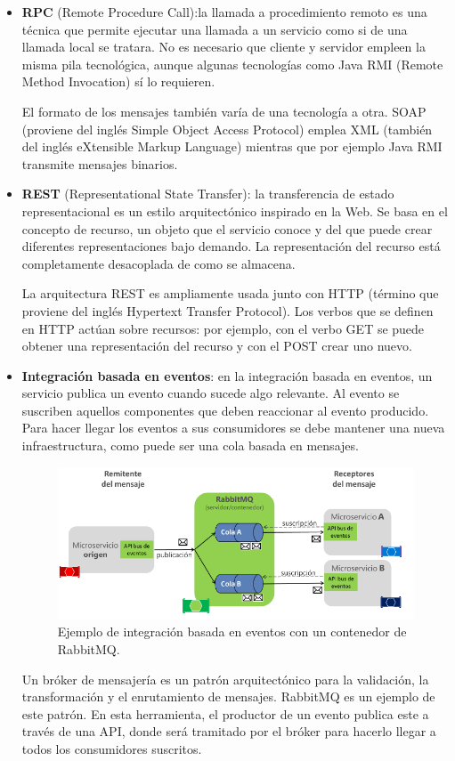 \documentclass[11pt,spanish,listoffigures]{tfgetsinf}
\begin{document}
\begin{itemize}

\item \textbf{RPC} (Remote Procedure Call):la llamada a procedimiento remoto es una técnica que permite ejecutar una llamada a un servicio como si de una llamada local se tratara. No es necesario que cliente y servidor empleen la misma pila tecnológica, aunque algunas tecnologías como Java RMI (Remote Method Invocation) sí lo requieren. 

El formato de los mensajes también varía de una tecnología a otra. SOAP (proviene del inglés Simple Object Access Protocol) emplea XML (también del inglés eXtensible Markup Language) mientras que por ejemplo Java RMI transmite mensajes binarios.

\item \textbf{REST} (Representational State Transfer): la transferencia de estado representacional es un estilo arquitectónico inspirado en la Web. Se basa en el concepto de recurso, un objeto que el servicio conoce y del que puede crear diferentes representaciones bajo demando. La representación del recurso está completamente desacoplada de como se almacena.

La arquitectura REST es ampliamente usada junto con HTTP (término que proviene del inglés Hypertext Transfer Protocol). Los verbos que se definen en HTTP actúan sobre recursos: por ejemplo, con el verbo GET se puede obtener una representación del recurso y con el POST crear uno nuevo.

\item \textbf{Integración basada en eventos}: en la integración basada en eventos, un servicio publica un evento cuando sucede algo relevante. Al evento se suscriben aquellos componentes que deben reaccionar al evento producido. Para hacer llegar los eventos a sus consumidores se debe mantener una nueva infraestructura, como puede ser una cola basada en mensajes.

\begin{figure}[h]
\centering
\includegraphics[scale=0.85]{rabbitmq}
\caption{Ejemplo de integración basada en eventos con un contenedor de RabbitMQ. \cite{DelaTorre2018}}
\end{figure}

Un bróker de mensajería es un patrón arquitectónico para la validación, la transformación y el enrutamiento de mensajes. RabbitMQ es un ejemplo de este patrón. En esta herramienta, el productor de un evento publica este a través de una API, donde será tramitado por el bróker para hacerlo llegar a todos los consumidores suscritos.
 
\end{itemize}
\end{document}
